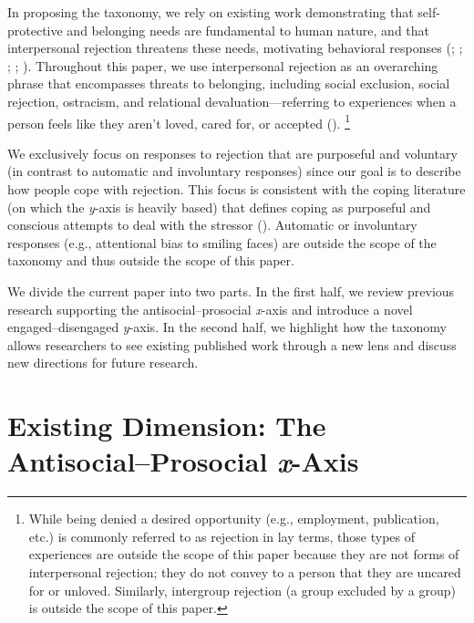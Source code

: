 \documentclass[
]{udthesis}
\begin{document}
In proposing the taxonomy, we rely on existing work demonstrating that
self-protective and belonging needs are fundamental to human nature, and
that interpersonal rejection threatens these needs, motivating
behavioral responses (; ; ; ; ). Throughout this paper, we use
interpersonal rejection as an overarching phrase that encompasses
threats to belonging, including social exclusion, social rejection,
ostracism, and relational devaluation---referring to experiences when a
person feels like they aren't loved, cared for, or accepted
(). \footnote{While being denied a desired opportunity (e.g., employment,
  publication, etc.) is commonly referred to as rejection in lay
  terms, those types of experiences are outside the scope of this
  paper because they are not forms of interpersonal rejection; they do
  not convey to a person that they are uncared for or unloved.
  Similarly, intergroup rejection (a group excluded by a group) is
  outside the scope of this paper.}

We exclusively focus on responses to rejection that are purposeful and
voluntary (in contrast to automatic and involuntary responses) since our
goal is to describe how people cope with rejection. This focus is
consistent with the coping literature (on which the \emph{y}-axis is heavily
based) that defines coping as purposeful and conscious attempts to deal
with the stressor ().
Automatic or involuntary responses (e.g., attentional bias to smiling
faces) are outside the scope of the taxonomy and thus outside the scope
of this paper.

We divide the current paper into two parts. In the first half, we review
previous research supporting the antisocial--prosocial \emph{x}-axis and
introduce a novel engaged--disengaged \emph{y}-axis. In the second half, we
highlight how the taxonomy allows researchers to see existing published
work through a new lens and discuss new directions for future research.

\section{\texorpdfstring{Existing Dimension: The Antisocial--Prosocial \emph{x}-Axis}{Existing Dimension: The Antisocial--Prosocial x-Axis}}\label{existing-dimension-the-antisocialprosocial-x-axis}
\end{document}
